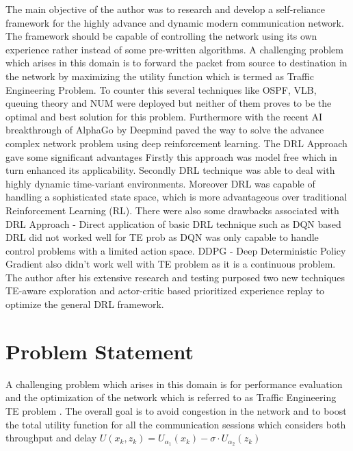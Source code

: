 The main objective of the author was to research and develop a self-reliance framework for the highly advance and dynamic modern communication network. The framework should be capable of controlling the network using its own experience rather instead of some pre-written algorithms. A challenging problem which arises in this domain is to forward the packet from source to destination in the network by maximizing the utility function which is termed as Traffic Engineering Problem. To counter this several techniques like OSPF, VLB, queuing theory and NUM were deployed but neither of them proves to be the optimal and best solution for this problem. Furthermore with the recent AI breakthrough of AlphaGo by Deepmind paved the way to solve the advance complex network problem using deep reinforcement learning.
The DRL \cite{mnih2015humanlevel} Approach gave some significant advantages Firstly this approach was model free which in turn enhanced its applicability.
Secondly DRL technique was able to deal with highly dynamic time-variant environments.
Moreover DRL was capable of handling a sophisticated state space, which is more advantageous over traditional Reinforcement Learning (RL).
There were also some drawbacks associated with DRL Approach - Direct application of basic DRL technique such as DQN \cite{mnih2015humanlevel} based DRL did not worked well for TE prob as DQN was only capable to handle control problems with a limited action space.
DDPG \cite{pmlr-v32-silver14} - Deep Deterministic Policy Gradient also didn't work well with TE problem as it is a continuous problem.
The author after his extensive research and testing purposed two new techniques TE-aware exploration and actor-critic based prioritized experience replay to optimize the general DRL framework.


\section{Problem Statement}
\label{sec:problem}

A challenging problem which arises in this domain is for performance evaluation and the optimization of the network which is referred to as Traffic Engineering TE problem \cite{Exp:_DRLapproach}. 
The overall goal is to avoid congestion in the network and to boost the total utility function \cite{Exp:_DRLapproach} for all the communication sessions which considers both throughput and delay 
$U\left(x_{k}, z_{k}\right)=U_{\alpha_{1}}\left(x_{k}\right)-\sigma \cdot U_{\alpha_{2}}\left(z_{k}\right)$               


